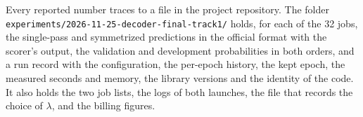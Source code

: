 Every reported number traces to a file in the project repository. The folder \nolinkurl{experiments/2026-11-25-decoder-final-track1/} holds, for each of the 32 jobs, the single-pass and symmetrized predictions in the official format with the scorer's output, the validation and development probabilities in both orders, and a run record with the configuration, the per-epoch history, the kept epoch, the measured seconds and memory, the library versions and the identity of the code. It also holds the two job lists, the logs of both launches, the file that records the choice of $\lambda$, and the billing figures.
